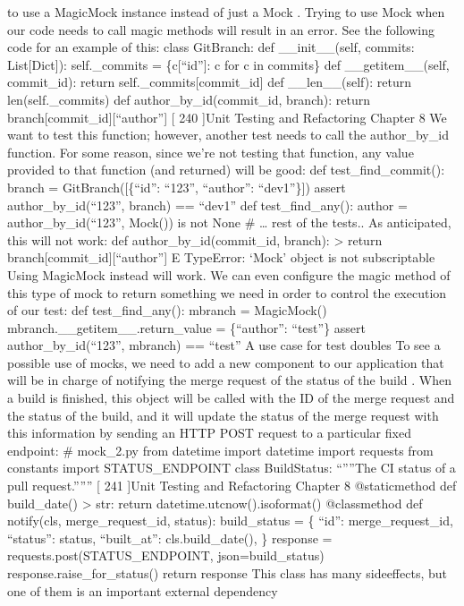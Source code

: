 \documentclass[a4paper,10pt,english]{sphinxmanual}
\begin{document}
to use a MagicMock instance instead of just a Mock .
Trying to use Mock when our code needs to call magic methods will result in an error. See
the following code for an example of this:
class GitBranch:
def \_\_init\_\_(self, commits: List{[}Dict{]}):
self.\_commits = \{c{[}“id”{]}: c for c in commits\}
def \_\_getitem\_\_(self, commit\_id):
return self.\_commits{[}commit\_id{]}
def \_\_len\_\_(self):
return len(self.\_commits)
def author\_by\_id(commit\_id, branch):
return branch{[}commit\_id{]}{[}“author”{]}
{[} 240 {]}Unit Testing and Refactoring
Chapter 8
We want to test this function; however, another test needs to call
the author\_by\_id function. For some reason, since we’re not testing that function, any
value provided to that function (and returned) will be good:
def test\_find\_commit():
branch = GitBranch({[}\{“id”: “123”, “author”: “dev1”\}{]})
assert author\_by\_id(“123”, branch) == “dev1”
def test\_find\_any():
author = author\_by\_id(“123”, Mock()) is not None
\# … rest of the tests..
As anticipated, this will not work:
def author\_by\_id(commit\_id, branch):
\textgreater{} return branch{[}commit\_id{]}{[}“author”{]}
E TypeError: ‘Mock’ object is not subscriptable
Using MagicMock instead will work. We can even configure the magic method of this type
of mock to return something we need in order to control the execution of our test:
def test\_find\_any():
mbranch = MagicMock()
mbranch.\_\_getitem\_\_.return\_value = \{“author”: “test”\}
assert author\_by\_id(“123”, mbranch) == “test”
A use case for test doubles
To see a possible use of mocks, we need to add a new component to our application that
will be in charge of notifying the merge request of the status of the build . When a build
is finished, this object will be called with the ID of the merge request and the status of the
build, and it will update the status of the merge request with this information by
sending an HTTP POST request to a particular fixed endpoint:
\# mock\_2.py
from datetime import datetime
import requests
from constants import STATUS\_ENDPOINT
class BuildStatus:
“””The CI status of a pull request.”””
{[} 241 {]}Unit Testing and Refactoring
Chapter 8
@staticmethod
def build\_date() \sphinxhyphen{}\textgreater{} str:
return datetime.utcnow().isoformat()
@classmethod
def notify(cls, merge\_request\_id, status):
build\_status = \{
“id”: merge\_request\_id,
“status”: status,
“built\_at”: cls.build\_date(),
\}
response = requests.post(STATUS\_ENDPOINT, json=build\_status)
response.raise\_for\_status()
return response
This class has many side\sphinxhyphen{}effects, but one of them is an important external dependency
\end{document}
